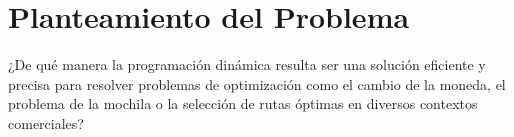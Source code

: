 \section{Planteamiento del Problema}
¿De qué manera la programación dinámica resulta ser una solución eficiente y precisa para resolver problemas de optimización como el cambio de la moneda, el problema de la mochila o la selección de rutas óptimas en diversos contextos comerciales?
